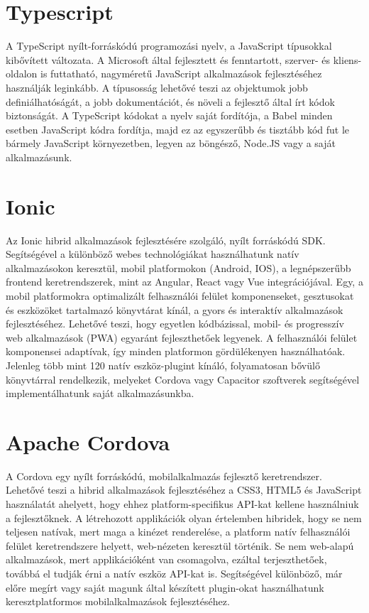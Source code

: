 \documentclass[12pt]{report}
\begin{document}
\section{Typescript}
A TypeScript nyílt-forráskódú programozási nyelv, a JavaScript típusokkal kibővített változata. A Microsoft által fejlesztett és fenntartott, szerver- és kliens-oldalon is futtatható, nagyméretű JavaScript alkalmazások fejlesztéséhez használják leginkább.
A típusosság lehetővé teszi az objektumok jobb definiálhatóságát, a jobb dokumentációt, és növeli a fejlesztő által írt kódok biztonságát.
A TypeScript kódokat a nyelv saját fordítója, a Babel minden esetben JavaScript kódra fordítja, majd ez az egyszerűbb és tisztább kód fut le bármely JavaScript környezetben, legyen az böngésző, Node.JS vagy a saját alkalmazásunk. 

\section{Ionic}
Az Ionic hibrid alkalmazások fejlesztésére szolgáló, nyílt forráskódú SDK. Segítségével a különböző webes technológiákat használhatunk natív alkalmazásokon keresztül, mobil platformokon (Android, IOS), a legnépszerűbb frontend keretrendszerek, mint az Angular, React vagy Vue integrációjával. Egy, a mobil platformokra optimalizált felhasználói felület komponenseket, gesztusokat és eszközöket tartalmazó könyvtárat kínál, a gyors és interaktív alkalmazások fejlesztéséhez. Lehetővé teszi, hogy egyetlen kódbázissal, mobil- és progresszív web alkalmazások (PWA) egyaránt fejleszthetőek legyenek. A felhasználói felület komponensei adaptívak, így minden platformon gördülékenyen használhatóak. Jelenleg több mint 120 natív eszköz-plugint kínáló, folyamatosan bővülő könyvtárral rendelkezik, melyeket Cordova vagy Capacitor szoftverek segítségével implementálhatunk saját alkalmazásunkba.

\section{Apache Cordova}
A Cordova egy nyílt forráskódú, mobilalkalmazás fejlesztő keretrendszer. Lehetővé teszi a hibrid alkalmazások fejlesztéséhez a CSS3, HTML5 és JavaScript használatát ahelyett, hogy ehhez platform-specifikus API-kat kellene használniuk a fejlesztőknek. A létrehozott applikációk olyan értelemben hibridek, hogy se nem teljesen natívak, mert maga a kinézet renderelése, a platform natív felhasználói felület keretrendszere helyett, web-nézeten keresztül történik. Se nem web-alapú alkalmazások, mert applikációként van csomagolva, ezáltal terjeszthetőek, továbbá el tudják érni a natív eszköz API-kat is.
Segítségével különböző, már előre megírt vagy saját magunk által készített plugin-okat használhatunk keresztplatformos mobilalkalmazások fejlesztéséhez.
\end{document}
